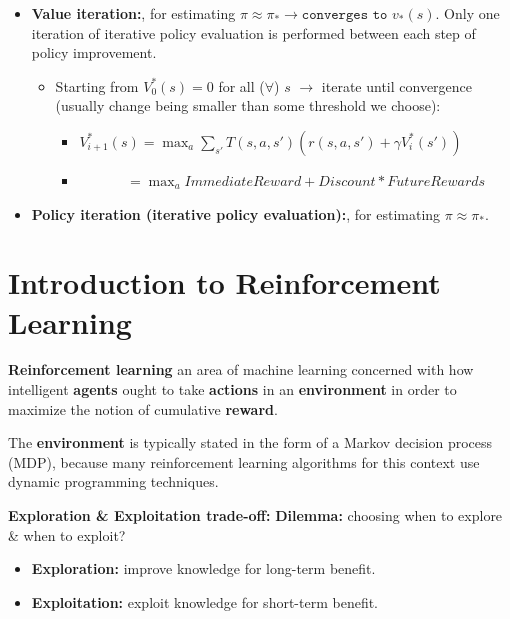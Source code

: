 \documentclass[12pt, a4paper]{article}
\let\stdsection\section
\renewcommand\section{\newpage\stdsection} %
\begin{document}
\begin{itemize}
\item
  \textbf{Value iteration:}, for estimating
  \(\pi \approx \pi_* \rightarrow \texttt{converges to } v_*(s)\). Only
  one iteration of iterative policy evaluation is performed between each
  step of policy improvement.

  \begin{itemize}
  \item
    Starting from \(V_0^*(s)=0\) for all (\(\forall\)) \(s\)
    \(\rightarrow\) iterate until convergence (usually change being
    smaller than some threshold we choose):

    \begin{itemize}
    \item
      \(V_{i+1}^*(s) = \max_a \sum_{s'} T(s,a,s') (r(s,a,s') + \gamma V_i^*(s'))\)
    \item
      \(\;\;\;\;\;\;\;\;\;\;\;\; = \max_a ImmediateReward + Discount*FutureRewards\)
    \end{itemize}
  \end{itemize}
\item
  \textbf{Policy iteration (iterative policy evaluation):}, for
  estimating \(\pi \approx \pi_*\).
\end{itemize}














\section{Introduction to Reinforcement Learning}\label{introduction-to-reinforcement-learning}

\textbf{Reinforcement learning} an area of machine learning concerned with how intelligent \textbf{agents} ought to take \textbf{actions} in an \textbf{environment} in order to maximize the notion of cumulative \textbf{reward}.

The \textbf{environment} is typically stated in the form of a Markov
decision process (MDP), because many reinforcement learning algorithms
for this context use dynamic programming techniques.

\textbf{Exploration \& Exploitation trade-off:} \textbf{Dilemma:}
choosing when to explore \& when to exploit?

\begin{itemize}
  \item \textbf{Exploration:} improve knowledge for long-term benefit.
  \item \textbf{Exploitation:} exploit knowledge for short-term benefit.
\end{itemize}
\end{document}
